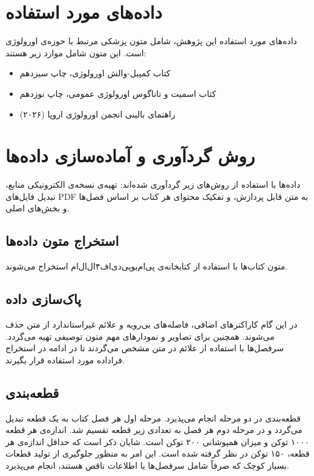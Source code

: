 \section{داده‌های مورد استفاده}

داده‌های مورد استفاده این پژوهش، شامل متون پزشکی مرتبط با حوزه‌ی اورولوژی است. این متون شامل موارد زیر هستند:

\begin{itemize}
\item کتاب کمپبل-والش اورولوژی، چاپ سیزدهم
\item کتاب اسمیت و تاناگوس اورولوژی عمومی، چاپ نوزدهم
\item راهنمای بالینی انجمن اورولوژی اروپا (۲۰۲۶)
\end{itemize}

\section{روش گردآوری و آماده‌سازی داده‌ها}

داده‌ها با استفاده از روش‌های زیر گردآوری شده‌اند: تهیه‌ی نسخه‌ی الکترونیکی منابع، تبدیل فایل‌های PDF به متن قابل پردازش، و تفکیک محتوای هر کتاب بر اساس فصل‌ها و بخش‌های اصلی.

\subsection{استخراج متون داده‌ها}

متون کتاب‌ها با استفاده از کتابخانه‌ی پی‌ام‌یو‌پی‌دی‌اف۴ال‌ال‌ام
 استخراج می‌شوند.

\subsection{پاک‌سازی داده}

در این گام کاراکترهای اضافی، فاصله‌های بی‌رویه و علائم غیراستاندارد از متن حذف می‌شوند. همچنین برای تصاویر و نمودار‌های مهم متون توصیفی تهیه می‌گردد. سرفصل‌ها با استفاده از علائم در متن مشخص می‌گردند تا در ادامه در استخراج فراداده مورد استفاده قرار بگیرند.

\subsection{قطعه‌بندی}

قطعه‌بندی در دو مرحله انجام می‌پذیرد. مرحله اول هر فصل کتاب به یک قطعه تبدیل می‌گردد و در مرحله دوم هر فصل به تعدادی زیر قطعه تقسیم شد. اندازه‌ی هر قطعه ۱۰۰۰ توکن و میزان همپوشانی ۲۰۰ توکن است. شایان ذکر است که حداقل اندازه‌ی هر قطعه، ۱۵۰ توکن در نظر گرفته شده است. این امر به منظور جلوگیری از تولید قطعات بسیار کوچک که صرفاً شامل سرفصل‌ها یا اطلاعات ناقص هستند، انجام می‌پذیرد.

